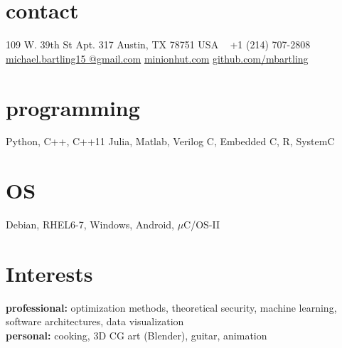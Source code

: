 \documentclass[]{friggeri-cv} %
\begin{document}

\begin{aside} %
\section{contact}
109 W. 39th St
Apt. 317
Austin, TX 78751
USA
~
+1 (214) 707-2808
~
\href{mailto:michael.bartling15@gmail.com}{michael.bartling15
@gmail.com}
\href{http://www.minionhut.com}{minionhut.com}
\href{http://github.com/mbartling}{github.com/mbartling}
\section{programming}
{%
Python, C++, C++11
Julia, Matlab, Verilog
C, Embedded C, R, SystemC}
\section{OS}
Debian, RHEL6-7,
Windows, Android,
$\mu$C/OS-II
\end{aside}

\section{Interests}

\textbf{professional:} optimization methods, theoretical security, machine learning, software architectures, data visualization \\ \textbf{personal:} cooking, 3D CG art (Blender), guitar, animation 
\end{document}
